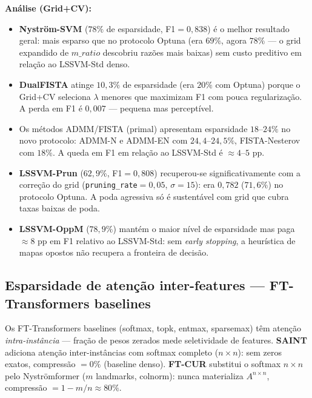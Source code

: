 \documentclass[12pt,a4paper]{article}
\begin{document}
\textbf{Análise (Grid+CV):}
\begin{itemize}
  \item \textbf{Nyström-SVM} ($78\%$ de esparsidade, F1$=0{,}838$) é o melhor
        resultado geral: mais esparso que no protocolo Optuna (era $69\%$, agora
        $78\%$ — o grid expandido de $m\_ratio$ descobriu razões mais baixas) sem
        custo preditivo em relação ao LSSVM-Std denso.
  \item \textbf{DualFISTA} atinge $10{,}3\%$ de esparsidade (era $20\%$ com
        Optuna) porque o Grid+CV seleciona $\lambda$ menores que maximizam F1 com
        pouca regularização. A perda em F1 é $0{,}007$ --- pequena mas
        perceptível.
  \item Os métodos ADMM/FISTA (primal) apresentam esparsidade $18$--$24\%$ no
        novo protocolo: ADMM-N e ADMM-EN com $24{,}4$--$24{,}5\%$,
        FISTA-Nesterov com $18\%$. A queda em F1 em relação ao LSSVM-Std é
        $\approx 4$--$5$ pp.
  \item \textbf{LSSVM-Prun} ($62{,}9\%$, F1$=0{,}808$) recuperou-se
        significativamente com a correção do grid (\texttt{pruning\_rate}$=0{,}05$,
        $\sigma=15$): era $0{,}782$ ($71{,}6\%$) no protocolo Optuna. A poda
        agressiva só é sustentável com grid que cubra taxas baixas de poda.
  \item \textbf{LSSVM-OppM} ($78{,}9\%$) mantém o maior nível de esparsidade mas
        paga $\approx 8$ pp em F1 relativo ao LSSVM-Std: sem \emph{early stopping},
        a heurística de mapas opostos não recupera a fronteira de decisão.
\end{itemize}

\subsection{Esparsidade de atenção inter-features — FT-Transformers baselines}

\begin{tcolorbox}[colback=fixbg, colframe=fixborder, fonttitle=\bfseries,
  title=\textbf{Nota: esparsidade inter-features vs.\ compressão inter-instâncias}]
Os FT-Transformers baselines (softmax, topk, entmax, sparsemax) têm atenção
\emph{intra-instância} --- fração de pesos zerados mede seletividade de features.
\textbf{SAINT} adiciona atenção inter-instâncias com softmax completo ($n \times n$):
sem zeros exatos, compressão $= 0\%$ (baseline denso). \textbf{FT-CUR} substitui
o softmax $n \times n$ pelo Nyströmformer ($m$ landmarks, colnorm): nunca
materializa $A^{n \times n}$, compressão $= 1 - m/n \approx 80\%$.
\end{tcolorbox}
\end{document}
